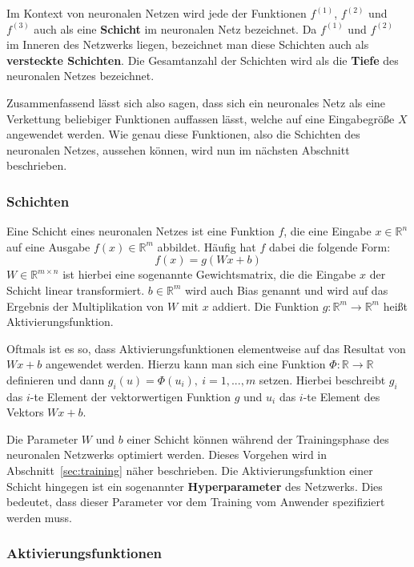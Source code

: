 Im Kontext von neuronalen Netzen wird jede der Funktionen
$f^{(1)}$, $f^{(2)}$ und $f^{(3)}$ auch als eine \textbf{Schicht} im
neuronalen Netz bezeichnet.
Da $f^{(1)}$ und $f^{(2)}$ im Inneren des Netzwerks liegen, bezeichnet man
diese Schichten auch als \textbf{versteckte Schichten}.
Die Gesamtanzahl der Schichten wird als die \textbf{Tiefe} des neuronalen
Netzes bezeichnet.

Zusammenfassend l\"asst sich also sagen, dass sich ein neuronales Netz als
eine Verkettung beliebiger Funktionen auffassen l\"asst, welche auf
eine Eingabegr\"o{\ss}e $X$ angewendet werden.
Wie genau diese Funktionen, also die Schichten des neuronalen Netzes,
aussehen k\"onnen, wird nun im n\"achsten
Abschnitt beschrieben.

\subsubsection{Schichten}

Eine Schicht eines neuronalen Netzes ist eine Funktion $f$, die eine
Eingabe $x \in \mathbb{R}^n$ auf eine Ausgabe $f(x) \in \mathbb{R}^m$
abbildet. H\"aufig hat $f$ dabei die folgende Form:
\begin{equation}
    f(x) = g(Wx + b)
\end{equation}
$W \in \mathbb{R}^{m \times n}$ ist hierbei eine sogenannte Gewichtsmatrix,
die die Eingabe $x$ der Schicht linear transformiert.
$b \in \mathbb{R}^m$ wird auch Bias genannt und wird auf das Ergebnis der
Multiplikation von $W$ mit $x$ addiert.
Die Funktion $g: \mathbb{R}^m \rightarrow \mathbb{R}^m$ hei{\ss}t
Aktivierungsfunktion.

Oftmals ist es so, dass Aktivierungsfunktionen elementweise auf das
Resultat von $Wx + b$ angewendet werden. Hierzu kann man sich eine
Funktion $\Phi: \mathbb{R} \rightarrow \mathbb{R}$ definieren und dann
$g_i(u) = \Phi(u_i), \  i=1,...,m$ setzen. Hierbei beschreibt $g_i$
das $i$-te Element der vektorwertigen Funktion $g$ und $u_i$ das $i$-te
Element des Vektors $Wx + b$.

Die Parameter $W$ und $b$ einer Schicht k\"onnen w\"ahrend der Trainingsphase
des neuronalen Netzwerks optimiert werden. Dieses Vorgehen wird in
Abschnitt~\ref{sec:training} n\"aher beschrieben.
Die Aktivierungsfunktion einer Schicht hingegen ist ein sogenannter
\textbf{Hyperparameter} des Netzwerks. Dies bedeutet, dass dieser
Parameter vor dem Training vom Anwender spezifiziert werden muss.

\subsubsection{Aktivierungsfunktionen}

